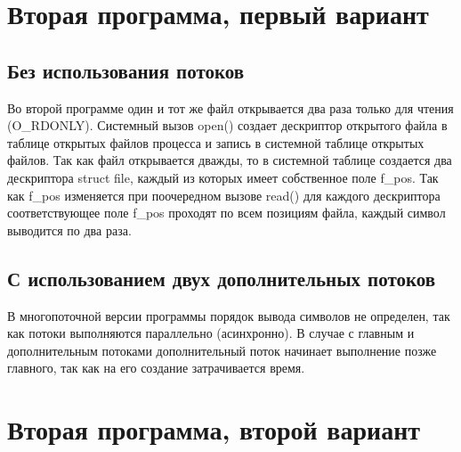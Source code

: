 \clearpage

\section{Вторая программа, первый вариант}

\subsection{Без использования потоков}



Во второй программе один и тот же файл открывается два раза только для чтения (O\_RDONLY).
Системный вызов open() создает дескриптор открытого файла в таблице открытых файлов процесса и запись в системной таблице открытых файлов.
Так как файл открывается дважды, то в системной таблице создается два дескриптора struct file, каждый из которых имеет собственное поле f\_pos.
Так как f\_pos изменяется при поочередном вызове read() для каждого дескриптора соответствующее поле f\_pos проходят по всем позициям файла, каждый символ выводится по два раза.


\clearpage

\subsection{С использованием двух дополнительных потоков}


\clearpage


В многопоточной версии программы порядок вывода символов не определен, так как потоки выполняются параллельно (асинхронно).
В случае с главным и дополнительным потоками дополнительный поток начинает выполнение позже главного, так как на его создание затрачивается время.

\clearpage

\section{Вторая программа, второй вариант}


